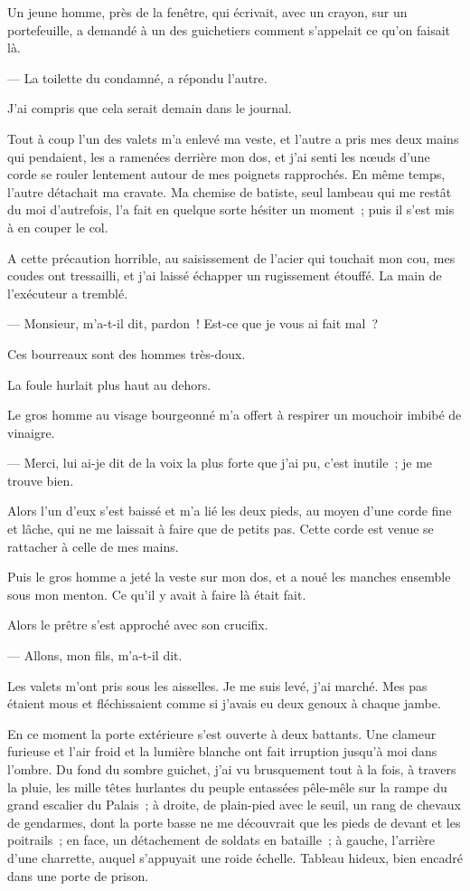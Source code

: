 \documentclass[french,twoside]{book} %
\begin{document}
Un jeune homme, près de la fenêtre, qui écrivait, avec un crayon, sur un portefeuille, a demandé à un des guichetiers comment s’appelait ce qu’on faisait là.\par
— La toilette du condamné, a répondu l’autre.\par
J’ai compris que cela serait demain dans le journal.\par
 Tout à coup l’un des valets m’a enlevé ma veste, et l’autre a pris mes deux mains qui pendaient, les a ramenées derrière mon dos, et j’ai senti les nœuds d’une corde se rouler lentement autour de mes poignets rapprochés. En même temps, l’autre détachait ma cravate. Ma chemise de batiste, seul lambeau qui me restât du moi d’autrefois, l’a fait en quelque sorte hésiter un moment ; puis il s’est mis à en couper le col.\par
A cette précaution horrible, au saisissement de l’acier qui touchait mon cou, mes coudes ont tressailli, et j’ai laissé échapper un rugissement étouffé. La main de l’exécuteur a tremblé.\par
— Monsieur, m’a-t-il dit, pardon ! Est-ce que je vous ai fait mal ?\par
Ces bourreaux sont des hommes très-doux.\par
La foule hurlait plus haut au dehors.\par
Le gros homme au visage bourgeonné m’a offert à respirer un mouchoir imbibé de vinaigre.\par
— Merci, lui ai-je dit de la voix la plus forte que j’ai pu, c’est inutile ; je me trouve bien.\par
Alors l’un d’eux s’est baissé et m’a lié les deux pieds, au moyen d’une corde fine et lâche, qui ne me laissait à faire que de petits pas. Cette corde est venue se rattacher à celle de mes mains.\par
Puis le gros homme a jeté la veste sur mon dos, et a noué les manches ensemble sous mon menton. Ce qu’il y avait à faire là était fait.\par
Alors le prêtre s’est approché avec son crucifix.\par
— Allons, mon fils, m’a-t-il dit.\par
 Les valets m’ont pris sous les aisselles. Je me suis levé, j’ai marché. Mes pas étaient mous et fléchissaient comme si j’avais eu deux genoux à chaque jambe.\par
En ce moment la porte extérieure s’est ouverte à deux battants. Une clameur furieuse et l’air froid et la lumière blanche ont fait irruption jusqu’à moi dans l’ombre. Du fond du sombre guichet, j’ai vu brusquement tout à la fois, à travers la pluie, les mille têtes hurlantes du peuple entassées pêle-mêle sur la rampe du grand escalier du Palais ; à droite, de plain-pied avec le seuil, un rang de chevaux de gendarmes, dont la porte basse ne me découvrait que les pieds de devant et les poitrails ; en face, un détachement de soldats en bataille ; à gauche, l’arrière d’une charrette, auquel s’appuyait une roide échelle. Tableau hideux, bien encadré dans une porte de prison.\par
\end{document}
